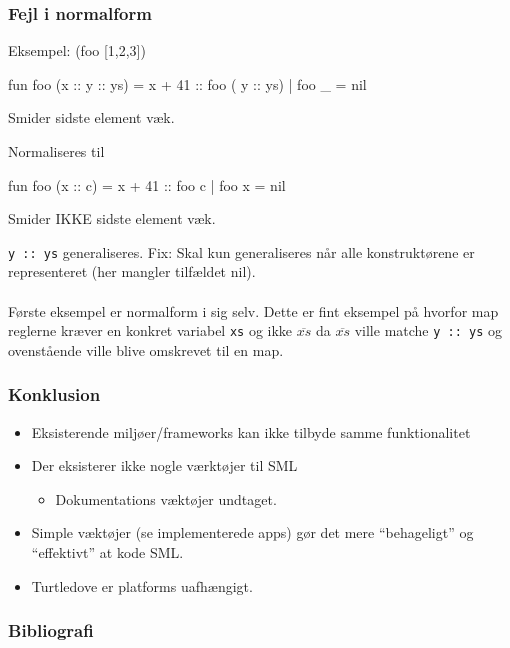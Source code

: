 \documentclass[slidestop,compress,mathserif, xcolor=dvipsnames]{beamer}
\newcommand{\smlinline}[1]{\lstinline{#1}}
\newcommand{\ol}[1]{\overline{#1}}
\begin{document}
\begin{frame}[c, fragile]
  \frametitle{Fejl i normalform}

  \tiny
  
    \begin{block}{Eksempel: (foo [1,2,3])}
    \begin{sml}
fun foo (x :: y :: ys) = x + 41 :: foo ( y :: ys)
  | foo _ = nil      
    \end{sml}

Smider sidste element væk.

Normaliseres til 
\begin{sml}  
fun foo (x :: c) = x + 41 :: foo c
  | foo x = nil
\end{sml}

Smider IKKE sidste element væk.    
  \end{block}

  \smlinline{y :: ys} generaliseres. Fix: Skal kun generaliseres når alle
  konstruktørene er representeret (her mangler tilfældet nil). \\ \ \\
  
  
  Første eksempel er normalform i sig selv. Dette er fint eksempel på hvorfor
  map reglerne kræver en konkret variabel \texttt{xs} og ikke $\ol{xs}$ da
  $\ol{xs}$ ville matche \texttt{y :: ys} og ovenstående ville blive omskrevet
  til en map.
  
\end{frame}


\begin{frame}[c, fragile]
  \frametitle{Konklusion}

  \footnotesize

  \begin{itemize}
  \item Eksisterende miljøer/frameworks kan ikke tilbyde samme funktionalitet

  \item Der eksisterer ikke nogle værktøjer til SML
    \begin{itemize}
    \item Dokumentations væktøjer undtaget.
    \end{itemize}

  \item Simple væktøjer (se implementerede apps) gør det mere "`behageligt"' og
    "`effektivt"' at kode SML.


  \item Turtledove er platforms uafhængigt.


  \end{itemize}
  

\end{frame}

\begin{frame}
  \frametitle{Bibliografi}

  
  
  
\end{frame}
\end{document}
